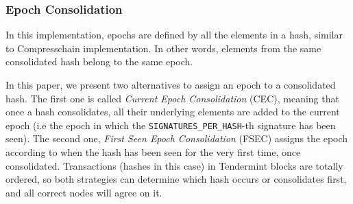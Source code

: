 %


%




\subsubsection{Epoch Consolidation}\label{subsubsec:consolidation}

In this implementation, epochs are defined by all the elements in a hash, similar to
Compresschain implementation.
%
In other words, elements from the same consolidated hash belong to the same
epoch.
%
%

%

In this paper, we present two alternatives to assign an epoch to a consolidated
hash.
%
The first one is called \textit{Current Epoch Consolidation} (CEC), meaning that
once a hash consolidates, all their underlying elements are added to the current
epoch (i.e the epoch in which the \texttt{SIGNATURES\_PER\_HASH}-th signature
has been seen).
%
The second one, \textit{First Seen Epoch Consolidation} (FSEC) assigns the epoch
according to when the hash has been seen for the very first time, once
consolidated.
%
Transactions (hashes in this case) in Tendermint blocks are totally
ordered, so both strategies can determine which hash occurs or
consolidates first, and all correct nodes will agree on it.

